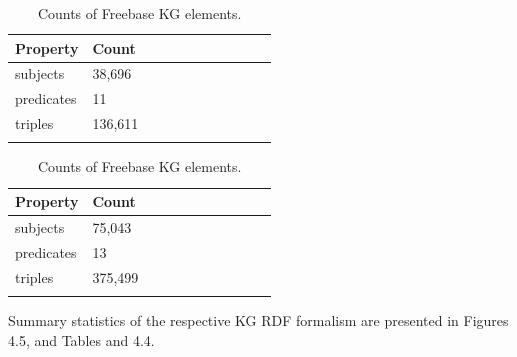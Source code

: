 \begin{table}[H]
	\parbox{.5\linewidth}{
		\centering
		\begin{tabular}{lllllllllll}
  			\textbf{Property} & \textbf{Count}  \\
  			\hline
  			subjects & 38,696  \\
  			predicates & 11  \\
  			triples & 136,611  \\
			&
		\end{tabular}
		\captionsetup{justification=centering}
		\caption{Counts of WordNet KG elements.}
		}
	\hfill
	\parbox{.5\linewidth}{
		\centering
		\begin{tabular}{lllllllllll}
  			\textbf{Property} & \textbf{Count}  \\
  			\hline
  			subjects & 75,043   \\
  			predicates & 13  \\
  			triples & 375,499  \\
			&
		\end{tabular}
		\captionsetup{justification=centering}
		\caption{Counts of Freebase KG elements.}
		}
\end{table}



\noindent Summary statistics of the respective KG RDF formalism are presented in Figures 4.5, and Tables and 4.4. \par

\bigskip

